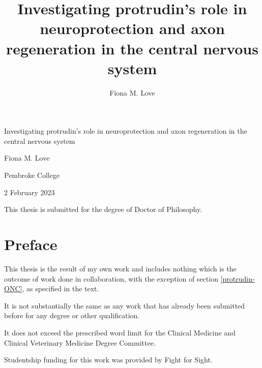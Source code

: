 \documentclass[
  12pt,
  a4paper,
]{book}
\title{Investigating protrudin's role in neuroprotection and axon regeneration in the central nervous system}
\author{Fiona M. Love}
\date{}
\begin{document}
\maketitle


\begin{titlepage}
\begin{center}

  \hspace{0pt}
  \vfill
  
  {\Huge
  Investigating protrudin's role in neuroprotection and axon regeneration in the central nervous system
  }\par
  
  {\Large
  Fiona M. Love
  }\par
  
   \vspace{1\baselineskip}
  
  {Pembroke College}\par
  {2 February 2023}\par
  
  \vspace{4\baselineskip}
  
  {This thesis is submitted for the degree of Doctor of Philosophy.}\par
  
  \vfill
  \hspace{0pt}

\end{center}
\end{titlepage}

\hypertarget{PREFACE}{%
\chapter*{Preface}\label{PREFACE}}


This thesis is the result of my own work and includes nothing which is the outcome of work done in collaboration, with the exception of section \ref{protrudin-ONC}, as specified in the text.

It is not substantially the same as any work that has already been submitted before for any degree or other qualification.

It does not exceed the prescribed word limit for the Clinical Medicine and Clinical Veterinary Medicine Degree Committee.

Studentship funding for this work was provided by Fight for Sight.
\end{document}
